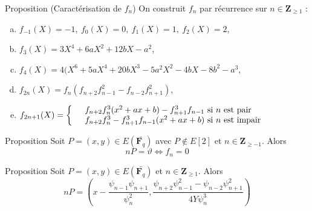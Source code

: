 \documentclass[french, lmodern]{beamer}
\newcommand\fq{\mathbf{F}_{q}}
\begin{document}
\begin{frame}
\transwipe
\begin{block}{Proposition (Caractérisation de $f_{n}$)}
On construit $f_{n}$ par récurrence sur $n\in\mathbf{Z}_{\geq 1}$ :
\begin{enumerate}[a)]
\item $f_{-1}(X)=-1,\ f_{0}(X)=0,\ f_{1}(X)=1,\ f_{2}(X)=2$,
\item $f_{3}(X)=3X^{4} + 6aX^{2} + 12bX - a^{2}$,
\item $f_{4}(X)=4(X^{6} + 5aX^{4} + 20bX^{3} - 5a^{2}X^{2} - 4bX - 8b^{2} - a^{3}$,
\item $f_{2n}(X)=f_{n}(f_{n+2}f_{n-1}^{2} - f_{n-2}f_{n+1}^{2})$,
\item $
f_{2n+1}(X) = \left\{ 
\begin{array}{cl cl}
 &f_{n+2}f_{n}^{3}(x^{2} + ax + b) - f_{n+1}^{3}f_{n-1} \text{ si  } n \text{ est pair}\\
  &f_{n+2}f_{n}^{3} - f_{n+1}^{3}f_{n-1}(x^{2} + ax + b)\text{ si } n \text{ est impair}\\ \end{array} \right.$
\end{enumerate}
\end{block}
\end{frame}

\begin{frame}
\transwipe
\begin{block}{Proposition}
Soit $P=(x,y)\in E(\bar{\fq})$ avec $P\notin E[2]$ et $n\in\mathbf{Z}_{\geq -1}$. Alors 
\begin{equation}
nP = \vartheta \Longleftrightarrow f_{n} = 0
\label{np1}
\end{equation}
\end{block}
\pause

\begin{block}{Proposition}
Soit $P=(x,y)\in E(\bar{\fq})$ et $n\in\mathbf{Z}_{\geq 1}$. Alors 
\begin{equation}
nP = \left(x - \dfrac{\psi_{n - 1}\psi_{n + 1}}{\psi_{n}^{2}},\dfrac{\psi_{n + 2}\psi_{n - 1}^{2} - \psi_{n - 2}\psi_{n + 1}^{2}}{4Y\psi_{n}^{3}}\right)
\label{np2}
\end{equation}
\end{block}
\end{frame}
\end{document}
